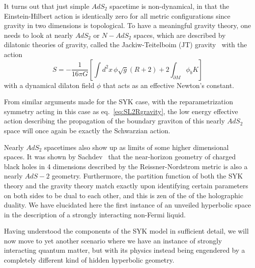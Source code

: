 \par
It turns out that just simple $AdS_2$ spacetime is non-dynamical, in that the Einstein-Hilbert action is identically zero for all metric configurations since gravity in two dimensions is topological. To have a meaningful gravity theory, one needs to look at nearly $AdS_2$ or $N-AdS_2$ spaces, which are described by dilatonic theories of gravity, called the Jackiw-Teitelboim (JT) gravity~\cite{almheiri2015models, sarosi2017ads} with the action 
\begin{equation}
    S = -\frac{1}{16\pi G}\left[\int d^2 x \, \phi\sqrt{g} (R + 2) + 2\int_{\partial M} \phi_b K\right] 
\end{equation}
with a dynamical dilaton field $\phi$ that acts as an effective Newton's constant. 

\par
From similar arguments made for the SYK case, with the reparametrization symmetry acting in this case as eq.~\eqref{eq:SL2Rgravity}, the low energy effective action describing the propagation of the boundary graviton of this nearly $AdS_2$ space will once again be exactly the Schwarzian action. 

\par
Nearly $AdS_2$ spacetimes also show up as limits of some higher dimensional spaces. It was shown by Sachdev~\cite{sachdev2015bekenstein} that the near-horizon geometry of charged black holes in 4 dimensions described by the Reissner-Nordstrom metric is also a nearly $AdS-2$ geometry. Furthermore, the partition function of both the SYK theory and the gravity theory match exactly upon identifying certain parameters on both sides to be dual to each other, and this is zen of the of the holographic duality. We have elucidated here the first instance of an unveiled hyperbolic space in the description of a strongly interacting non-Fermi liquid. 


\par
Having understood the components of the SYK model in sufficient detail, we will now move to yet another scenario where we have an instance of strongly interacting quantum matter, but with its physics instead being engendered by a completely different kind of hidden hyperbolic geometry.



